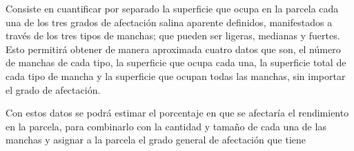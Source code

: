 
\begin{definition}
  Consiste en cuantificar por separado la superficie que ocupa en la parcela cada una de los tres grados de afectación salina aparente definidos, manifestados a través de los tres tipos de manchas; que pueden ser ligeras, medianas y fuertes. Esto permitirá obtener de manera aproximada cuatro datos que son, el número de manchas de cada tipo, la superficie que ocupa cada una, la superficie total de cada tipo de mancha y la superficie que ocupan todas las manchas, sin importar el grado de afectación.
\end{definition}
Con estos datos se podrá estimar el porcentaje en que se afectaría el rendimiento en la parcela, para combinarlo con la cantidad y tamaño de cada una de las manchas y asignar a la parcela el grado general de afectación que tiene
